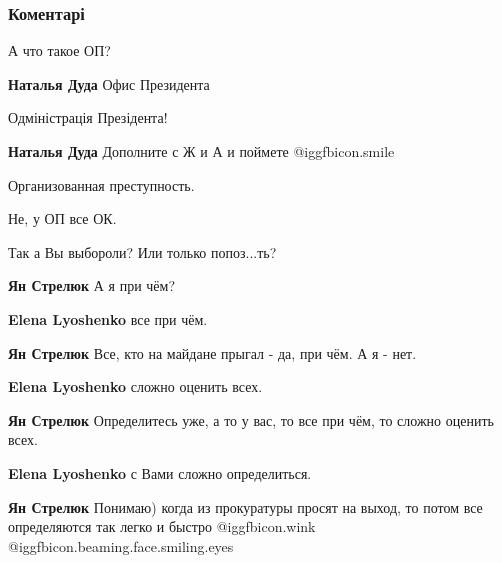  
 
 
 
 
\subsubsection{Коментарі}
\label{sec:21_11_2021.fb.ljoshenko_elena.kiev.jurist.1.gidnist_svoboda_netu.cmt}

\begin{itemize} %
А что такое ОП?

\begin{itemize} %
\textbf{Наталья Дуда}
Офис Президента

Одміністрація Презідента!

\textbf{Наталья Дуда} Дополните с Ж и А и поймете  @igg{fbicon.smile} 

Организованная преступность.

Не, у ОП все ОК.
\end{itemize} %

Так а Вы выбороли? Или только попоз...ть?

\begin{itemize} %
\textbf{Ян Стрелюк}
А я при чём?

\textbf{Elena Lyoshenko} все при чём.


\textbf{Ян Стрелюк}
Все, кто на майдане прыгал - да, при чём. А я - нет.

\textbf{Elena Lyoshenko} сложно оценить всех.


\textbf{Ян Стрелюк}
Определитесь уже, а то у вас, то все при чём, то сложно оценить всех.

\textbf{Elena Lyoshenko} с Вами сложно определиться.


\textbf{Ян Стрелюк}
Понимаю) когда из прокуратуры просят на выход, то потом все определяются так легко и быстро  @igg{fbicon.wink}  @igg{fbicon.beaming.face.smiling.eyes} 


\end{itemize}
\end{itemize}
